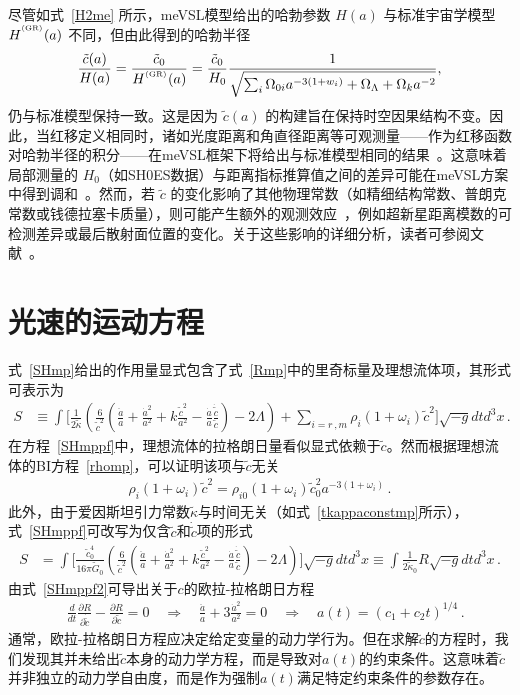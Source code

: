 \documentclass[jkps,preprint,fleqn]{revtex4}
\newcommand{\tc}{\tilde{c}}
\newcommand{\tG}{\tilde{G}}
\newcommand{\GR}{\text{GR}}
\newcommand{\tkapp}{\tilde{\kappa}}
\begin{document}
尽管如式~\eqref{H2me} 所示，meVSL模型给出的哈勃参数 $H(a)$ 与标准宇宙学模型 $H^{\textsuperscript{\tiny (\GR)}}(a)$ 不同，但由此得到的哈勃半径
\begin{equation}
    \frac{\tilde{c}(a)}{H(a)}  = \frac{\tc_0}{H^{\textsuperscript{\tiny (\GR)}}(a)} = \frac{\tilde{c}_0}{H_0} \frac{1}{\sqrt{\sum_i \Omega_{0i} a^{-3(1+w_i)} + \Omega_\Lambda + \Omega_k a^{-2}}},
\end{equation}
仍与标准模型保持一致。这是因为 $\tilde{c}(a)$ 的构建旨在保持时空因果结构不变。因此，当红移定义相同时，诸如光度距离和角直径距离等可观测量——作为红移函数对哈勃半径的积分——在meVSL框架下将给出与标准模型相同的结果~\cite{Lee:2020zts}。这意味着局部测量的 $H_0$（如SH0ES数据）与距离指标推算值之间的差异可能在meVSL方案中得到调和~\cite{Lee:2024nya}。然而，若 $\tilde{c}$ 的变化影响了其他物理常数（如精细结构常数、普朗克常数或钱德拉塞卡质量），则可能产生额外的观测效应~\cite{Lee:2020zts,Lee:2021xwh}，例如超新星距离模数的可检测差异或最后散射面位置的变化。关于这些影响的详细分析，读者可参阅文献~\cite{Lee:2020zts}。
\section{光速的运动方程}
\label{sec:sol}

式~\eqref{SHmp}给出的作用量显式包含了式~\eqref{Rmp}中的里奇标量及理想流体项，其形式可表示为
\begin{align}
S &\equiv \int \Biggl[ \frac{1}{2 \tkapp} \left( \frac{6}{\tc^2} \left( \frac{\ddot{a}}{a} + \frac{\dot{a}^2}{a^2} + k \frac{\tc^2}{a^2} - \frac{\dot{a}}{a} \frac{\dot{\tc}}{ \tc} \right)  - 2 \Lambda \right) + \sum_{i=r\,,m} \rho_i (1 + \omega_i ) \tc^2 \Biggr] \sqrt{-g} dt d^3x \label{SHmppf} \,.
\end{align}
在方程~\eqref{SHmppf}中，理想流体的拉格朗日量看似显式依赖于$\tc$。然而根据理想流体的BI方程~\eqref{rhomp}，可以证明该项与$\tc$无关
\begin{align}
 \rho_i (1 + \omega_i ) \tc^2 =  \rho_{i0} (1 + \omega_i ) \tc_{0}^2 a^{-3(1 + \omega_i )}  \label{rhoi} \,.
\end{align}
此外，由于爱因斯坦引力常数$\tkapp$与时间无关（如式~\eqref{tkappaconstmp}所示），式~\eqref{SHmppf}可改写为仅含$\tc$和$\dot{\tc}$项的形式
\begin{align}
S &= \int \Biggl[ \frac{\tc_0^4}{16 \pi \tG_0} \left( \frac{6}{\tc^2} \left( \frac{\ddot{a}}{a} + \frac{\dot{a}^2}{a^2} + k \frac{\tc^2}{a^2} - \frac{\dot{a}}{a} \frac{\dot{\tc}}{ \tc} \right)  - 2 \Lambda \right)  \Biggr] \sqrt{-g} dt d^3x \equiv \int \frac{1}{2 \tkapp_0} R \sqrt{-g} dt d^3x \label{SHmppf2} \,.
\end{align}
由式~\eqref{SHmppf2}可导出关于\( c \)的欧拉-拉格朗日方程
\begin{align}
& \frac{d}{dt} \frac{\partial R}{\partial \dot{\tc}} - \frac{\partial R}{\partial \tc} = 0 \quad \Rightarrow \quad \frac{\ddot{a}}{a} + 3 \frac{\dot{a}^2}{a^2} = 0 \quad \Rightarrow \quad a(t) = (c_1 + c_2 t)^{1/4} \label{eomtc} \,.
\end{align}
通常，欧拉-拉格朗日方程应决定给定变量的动力学行为。但在求解$\tc$的方程时，我们发现其并未给出$\tc$本身的动力学方程，而是导致对$a(t)$的约束条件。这意味着$\tc$并非独立的动力学自由度，而是作为强制$a(t)$满足特定约束条件的参数存在。
\end{document}

